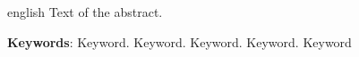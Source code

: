 \begin{resumo}[Abstract]
    \begin{otherlanguage*}{english}
        Text of the abstract.\par
        \textbf{Keywords}: Keyword. Keyword. Keyword. Keyword. Keyword
    \end{otherlanguage*}
\end{resumo}